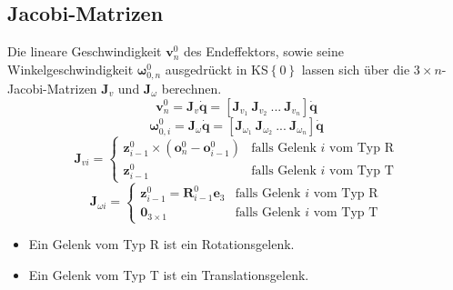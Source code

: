 \subsection*{Jacobi-Matrizen}
Die lineare Geschwindigkeit $\bm{v}^0_n$ des Endeffektors, sowie seine Winkelgeschwindigkeit $\bm{\omega}^0_{0,n}$ ausgedrückt in KS$\left\{0\right\}$ lassen sich über die $3\times n$-Jacobi-Matrizen $\bm{J}_v$ und $\bm{J}_{\omega}$ berechnen. 
%
\begin{equation}
	\bm{v}^0_n = \bm{J}_v \dot{\bm{q}} = \left[\bm{J}_{v_1} \ \bm{J}_{v_2} \ ...\  \bm{J}_{v_n}\right] \dot{\bm{q}}
\end{equation}
%
\begin{equation}
	\bm{\omega}^0_{0,i} = \bm{J}_{\omega} \dot{\bm{q}}  = \left[\bm{J}_{\omega_1} \ \bm{J}_{\omega_2} \ ...\  \bm{J}_{\omega_n}\right] \dot{\bm{q}}
\end{equation}
%
\begin{equation}
	\bm{J}_{vi} = \begin{cases} 
		\bm{z}^0_{i-1} \times (\bm{o}^0_{n} - \bm{o}^0_{i-1}) & \text{falls Gelenk } i \text{ vom Typ } \text{R} \\
		\bm{z}^0_{i-1} & \text{falls Gelenk } i \text{ vom Typ } \text{T}
	\end{cases}
\end{equation}
%
\begin{equation}
	\bm{J}_{\omega i} = \begin{cases} 
		\bm{z}^0_{i-1} = \bm{R}^0_{i-1}\bm{e}_3 & \text{falls Gelenk } i \text{ vom Typ } \text{R} \\
		\mathbf{0}_{3 \times 1} & \text{falls Gelenk } i \text{ vom Typ } \text{T}
	\end{cases}
\end{equation}
%
\begin{itemize}
	\item Ein Gelenk vom Typ R ist ein Rotationsgelenk.
	\item Ein Gelenk vom Typ T ist ein Translationsgelenk.
\end{itemize}
%
\cite{Rieber.2022}
%
